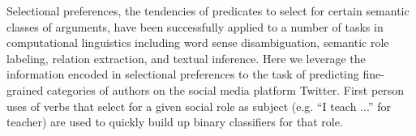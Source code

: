 Selectional preferences, the tendencies of predicates to select for certain semantic classes of arguments, have been successfully applied to a number of tasks in computational linguistics including word sense disambiguation, semantic role labeling, relation extraction, and textual inference. Here we leverage the information encoded in selectional preferences to the task of predicting fine-grained categories of authors on the social media platform Twitter. First person uses of verbs that select for a given social role as subject (e.g. ``I teach ...'' for teacher) are used to quickly build up binary classifiers for that role.
